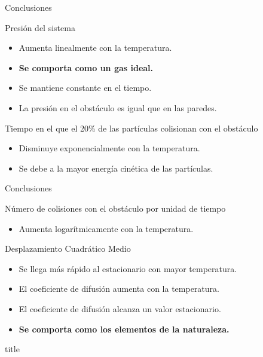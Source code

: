 \documentclass{beamer}
\begin{document}
        \begin{frame}{Conclusiones}
            \begin{block}{Presión del sistema}
                \begin{itemize}
                    \item Aumenta linealmente con la temperatura.
                    \item \textbf{Se comporta como un gas ideal.}
                    \item Se mantiene constante en el tiempo.
                    \item La presión en el obstáculo es igual que en las paredes.
                \end{itemize}
            \end{block}
            \begin{block}{Tiempo en el que el 20\% de las partículas colisionan con el obstáculo}
                \begin{itemize}
                    \item Disminuye exponencialmente con la temperatura.
                    \item Se debe a la mayor energía cinética de las partículas.
                \end{itemize}
            \end{block}
        \end{frame}

        \begin{frame}{Conclusiones}
            \begin{block}{Número de colisiones con el obstáculo por unidad de tiempo}
                \begin{itemize}
                    \item Aumenta logarítmicamente con la temperatura.
                \end{itemize}
            \end{block}
            \begin{block}{Desplazamiento Cuadrático Medio}
                \begin{itemize}
                    \item Se llega más rápido al estacionario con mayor temperatura.
                    \item El coeficiente de difusión aumenta con la temperatura.
                    \item El coeficiente de difusión alcanza un valor estacionario.
                    \item \textbf{Se comporta como los elementos de la naturaleza.}
                \end{itemize}
            \end{block}
        \end{frame}

        \begin{frame}
            \begin{beamercolorbox}[sep=8pt,center]{title}
            \end{beamercolorbox}
        \end{frame}
\end{document}
